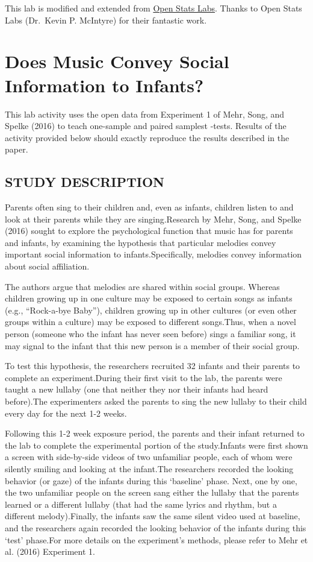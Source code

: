 \documentclass[]{book}
\theoremstyle{definition}
\theoremstyle{definition}
\theoremstyle{definition}
\theoremstyle{remark}
\begin{document}
This lab is modified and extended from
\href{https://sites.trinity.edu/osl}{Open Stats Labs}. Thanks to Open
Stats Labs (Dr.~Kevin P. McIntyre) for their fantastic work.

\section{Does Music Convey Social Information to
Infants?}\label{does-music-convey-social-information-to-infants}

This lab activity uses the open data from Experiment 1 of Mehr, Song,
and Spelke (2016) to teach one-sample and paired samplest -tests.
Results of the activity provided below should exactly reproduce the
results described in the paper.

\subsection{STUDY DESCRIPTION}\label{study-description}

Parents often sing to their children and, even as infants, children
listen to and look at their parents while they are singing.Research by
Mehr, Song, and Spelke (2016) sought to explore the psychological
function that music has for parents and infants, by examining the
hypothesis that particular melodies convey important social information
to infants.Specifically, melodies convey information about social
affiliation.

The authors argue that melodies are shared within social groups. Whereas
children growing up in one culture may be exposed to certain songs as
infants (e.g., ``Rock-a-bye Baby''), children growing up in other
cultures (or even other groups within a culture) may be exposed to
different songs.Thus, when a novel person (someone who the infant has
never seen before) sings a familiar song, it may signal to the infant
that this new person is a member of their social group.

To test this hypothesis, the researchers recruited 32 infants and their
parents to complete an experiment.During their first visit to the lab,
the parents were taught a new lullaby (one that neither they nor their
infants had heard before).The experimenters asked the parents to sing
the new lullaby to their child every day for the next 1-2 weeks.

Following this 1-2 week exposure period, the parents and their infant
returned to the lab to complete the experimental portion of the
study.Infants were first shown a screen with side-by-side videos of two
unfamiliar people, each of whom were silently smiling and looking at the
infant.The researchers recorded the looking behavior (or gaze) of the
infants during this `baseline' phase. Next, one by one, the two
unfamiliar people on the screen sang either the lullaby that the parents
learned or a different lullaby (that had the same lyrics and rhythm, but
a different melody).Finally, the infants saw the same silent video used
at baseline, and the researchers again recorded the looking behavior of
the infants during this `test' phase.For more details on the
experiment's methods, please refer to Mehr et al. (2016) Experiment 1.
\end{document}
